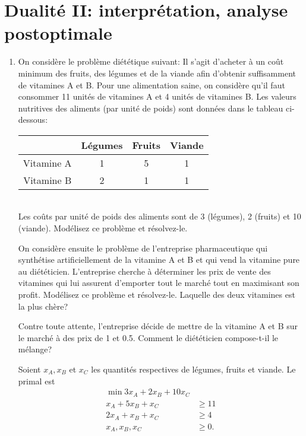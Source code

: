 \section{Dualit\'e II: interprétation, analyse postoptimale}

\begin{enumerate}

  \item On considère le problème diététique suivant:
    Il s'agit d'acheter à un coût minimum des fruits, des légumes et
    de la viande afin d'obtenir suffisamment de vitamines A et B.
    Pour une alimentation saine, on considère qu'il faut consommer
    11 unités de vitamines A et 4 unités de vitamines B. Les valeurs
    nutritives des aliments (par unité de poids) sont données dans
    le tableau ci-dessous: \\

    \begin{tabular}{|c|c|c|c|}
      \hline
      & Légumes & Fruits & Viande \\
      \hline
      Vitamine A & 1 & 5 & 1 \\
      \hline
      Vitamine B & 2 & 1 & 1 \\
      \hline
    \end{tabular}\\

    Les coûts par unité de poids des aliments sont de 3 (légumes),
    2 (fruits) et 10 (viande). Modélisez ce problème et résolvez-le.

    On considère ensuite le problème de l'entreprise pharmaceutique qui synthétise
    artificiellement de la vitamine A et B et qui vend la vitamine pure au diététicien.  L'entreprise cherche à déterminer les prix
    de vente des vitamines qui lui assurent d'emporter tout le marché tout en maximisant son profit. Modélisez ce problème
    et résolvez-le. Laquelle des deux vitamines est la plus chère?

    Contre toute attente, l'entreprise décide de mettre de la vitamine A et B sur le marché à des prix de 1 et 0.5. Comment le
    diététicien compose-t-il le mélange?

    \begin{solution}
      Soient $x_A, x_B$ et $x_C$ les quantités respectives
      de légumes, fruits et viande.
      Le primal est
      \begin{align*}
        \min 3x_A + 2x_B + 10x_C\\
        x_A + 5x_B + x_C & \geq 11\\
        2x_A + x_B + x_C & \geq 4\\
        x_A, x_B, x_C & \geq 0.
      \end{align*}


\end{solution}
\end{enumerate}
